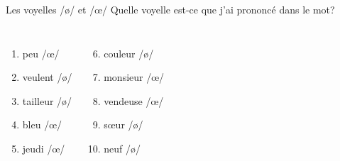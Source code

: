 \begin{frame}{Les voyelles /ø/ et /œ/}
  Quelle voyelle est-ce que j'ai prononcé dans le mot? \\
  \begin{columns}
      \begin{enumerate}
        \item peu  /œ/
        \item veulent /ø/ 
        \item tailleur /ø/ 
        \item bleu  /œ/
        \item jeudi  /œ/
      \end{enumerate}
      \begin{enumerate}
        \setcounter{enumi}{5}
        \item couleur /ø/ 
        \item monsieur  /œ/
        \item vendeuse  /œ/
        \item sœur /ø/ 
        \item neuf /ø/ 
      \end{enumerate}
  \end{columns}
\end{frame}